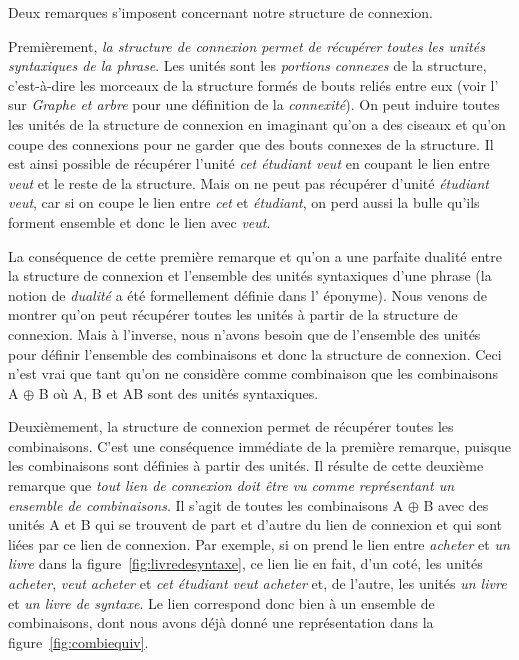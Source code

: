 Deux remarques s'imposent concernant notre structure de connexion.

Premièrement, \textit{la structure de connexion permet de récupérer toutes les unités syntaxiques de la phrase}. Les unités sont les \textit{portions connexes} de la structure, c'est-à-dire les morceaux de la structure formés de bouts reliés entre eux (voir l' sur \textit{Graphe et arbre} pour une définition de la \textit{connexité}). On peut induire toutes les unités de la structure de connexion en imaginant  qu’on a des ciseaux et qu’on coupe des connexions pour ne garder que des bouts connexes de la structure. Il est ainsi possible de récupérer l'unité \textit{cet étudiant veut} en coupant le lien entre \textit{veut} et le reste de la structure. Mais on ne peut pas récupérer d'unité \textit{étudiant veut}, car si on coupe le lien entre \textit{cet} et \textit{étudiant}, on perd aussi la bulle qu'ils forment ensemble et donc le lien avec \textit{veut}.
 
La conséquence de cette première remarque et qu'on a une parfaite dualité entre la structure de connexion et l'ensemble des unités syntaxiques d'une phrase (la notion de \textit{dualité} a été formellement définie dans l’ éponyme). Nous venons de montrer qu'on peut récupérer toutes les unités à partir de la structure de connexion. Mais à l'inverse, nous n'avons besoin que de l'ensemble des unités pour définir l'ensemble des combinaisons et donc la structure de conne\-xion. Ceci n'est vrai que tant qu'on ne considère comme combinaison que les combinaisons A ${\oplus}$ B où A, B et AB sont des unités syntaxiques.
 
Deuxièmement, la structure de connexion permet de récupérer toutes les combinaisons. C'est une conséquence immédiate de la première remarque, puisque les combinaisons sont définies à partir des unités. Il résulte de cette deuxième remarque que \textit{tout lien de connexion doit être vu comme représentant un ensemble de combinaisons}. Il s'agit de toutes les combinaisons A ${\oplus}$ B avec des unités A et B qui se trouvent de part et d'autre du lien de connexion et qui sont liées par ce lien de connexion. Par exemple, si on prend le lien entre \textit{acheter} et \textit{un livre} dans la figure~\ref{fig:livredesyntaxe}, ce lien lie en fait, d'un coté, les unités \textit{acheter}, \textit{veut acheter} et \textit{cet étudiant veut acheter} et, de l'autre, les unités \textit{un livre} et \textit{un livre de syntaxe}. Le lien correspond donc bien à un ensemble de combinaisons, dont nous avons déjà donné une représentation dans la figure~\ref{fig:combiequiv}.


